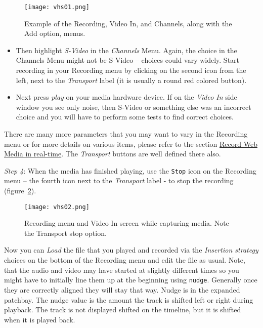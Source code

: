\begin{figure}[htpb]
    \centering
    \texttt{[image: vhs01.png]}
    \caption{Example of the Recording, Video In, and Channels, along with the Add option, menus.}
    \label{fig:vhs01}
\end{figure}

\begin{itemize}
    \item Then highlight \textit{S-Video} in the \textit{Channels} Menu.  Again, the choice in the Channels Menu might not be S-Video -- choices could vary widely. Start recording in your Recording menu by clicking on the second icon from the left, next to the \textit{Transport} label (it is usually a round red colored button).
    \item Next press \textit{play} on your media hardware device.  If on the \textit{Video In} side window you see only noise, then S-Video or something else was an incorrect choice and you will have to perform some tests to find correct choices.
\end{itemize}

There are many more parameters that you may want to vary in the Recording menu or for more details on various items, please refer to the section \hyperref[sec:record_web_media_rt]{Record Web Media in real-time}. The \textit{Transport} buttons are well defined there also.

\textit{Step 4}: When the media has finished playing, use the \texttt{Stop} icon on the Recording menu – the fourth icon next to the \textit{Transport} label - to stop the recording (figure~\ref{fig:vhs02}).

\begin{figure}[htpb]
    \centering
    \texttt{[image: vhs02.png]}
    \caption{Recording menu and Video In screen while capturing media.  Note the Transport stop option.}
    \label{fig:vhs02}
\end{figure}

Now you can \textit{Load} the file that you played and recorded via the \textit{Insertion strategy} choices on the bottom of the Recording menu and edit the file as usual.  Note, that the audio and video may have started at slightly different times so you might have to initially line them up at the beginning using \texttt{nudge}.  Generally once they are correctly aligned they will stay that way.  Nudge is in the expanded patchbay. The nudge value is the amount the track is shifted left or right during playback. The track is not displayed shifted on the timeline, but it is shifted when it is played back.

